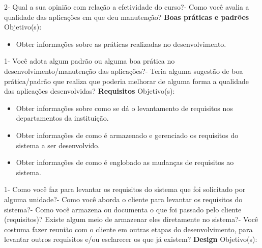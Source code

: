 \begin{anexosenv}
    2- Qual a sua opinião com relação a efetividade do curso?- Como você avalia a qualidade das aplicações em que deu manutenção?\newline
\newline\newline
\textbf{Boas práticas e padrões}\newline\newline
Objetivo(s):
\begin{itemize}
\item Obter informações sobre as práticas realizadas no desenvolvimento.
\end{itemize}
	1- Você adota algum padrão ou alguma boa prática no desenvolvimento/manutenção das aplicações?- Teria alguma sugestão de boa prática/padrão que realiza que poderia melhorar de alguma forma a qualidade das aplicações desenvolvidas?\newline
    \newline
\textbf{Requisitos}\newline\newline
Objetivo(s):
\begin{itemize}
\item Obter informações sobre como se dá o levantamento de requisitos nos departamentos da instituição.
\item Obter informações de como é armazenado e gerenciado os requisitos do sistema a ser desenvolvido.
\item Obter informações de como é englobado as mudanças de requisitos ao sistema.
\end{itemize}
    1- Como você faz para levantar os requisitos do sistema que foi solicitado por alguma unidade?- Como você aborda o cliente para levantar os requisitos do sistema?- Como você armazena ou documenta o que foi passado pelo cliente (requisitos)? Existe algum meio de armazenar eles diretamente no sistema?- Você costuma fazer reunião com o cliente em outras etapas do desenvolvimento, para levantar outros requisitos e/ou esclarecer os que já existem?\newline
    \newline
\textbf{Design}\newline\newline
Objetivo(s):
\begin{itemize}

\end{itemize}
\end{anexosenv}
